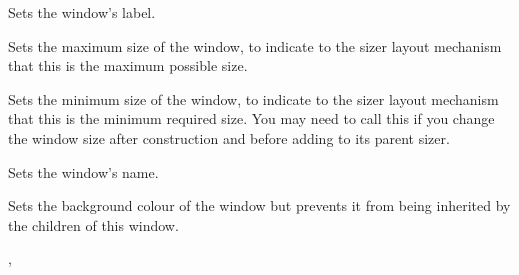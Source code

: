 \label{wxwindowsetlabel}


Sets the window's label.






\label{wxwindowsetmaxsize}


Sets the maximum size of the window, to indicate to the sizer layout mechanism
that this is the maximum possible size.

\label{wxwindowsetminsize}


Sets the minimum size of the window, to indicate to the sizer layout mechanism
that this is the minimum required size. You may need to call this
if you change the window size after construction and before adding
to its parent sizer.

\label{wxwindowsetname}


Sets the window's name.






\label{wxwindowsetownbackgroundcolour}


Sets the background colour of the window but prevents it from being inherited
by the children of this window.


,\rtfsp
{}


\label{wxwindowsetownfont}

